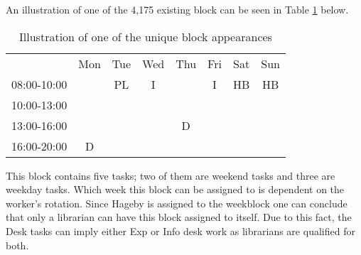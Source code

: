 An illustration of one of the 4,175 existing block can be seen in Table \ref{block_example} below.
\begin{table}[!h]
\centering
\caption{Illustration of one of the unique block appearances}
\label{block_example}
\begin{tabular}{cccccccc}
                           & Mon                                            & Tue                                             & Wed                    & Thu                                            & Fri                    & Sat                                             & Sun                                             \\ \cline{2-8} 
\multicolumn{1}{c|}{08:00-10:00}  & \multicolumn{1}{c|}{}                          & \multicolumn{1}{c|}{\cellcolor[HTML]{FCFF2F}PL} & \multicolumn{1}{c|}{I} & \multicolumn{1}{c|}{}                          & \multicolumn{1}{c|}{I} & \multicolumn{1}{c|}{\cellcolor[HTML]{FCFF2F}HB} & \multicolumn{1}{c|}{\cellcolor[HTML]{FCFF2F}HB} \\ \cline{2-8} 
\multicolumn{1}{c|}{10:00-13:00} & \multicolumn{1}{c|}{}                          & \multicolumn{1}{c|}{\cellcolor[HTML]{FCFF2F}}   & \multicolumn{1}{c|}{}  & \multicolumn{1}{c|}{}                          & \multicolumn{1}{c|}{}  &                                                 &                                                 \\ \cline{2-6}
\multicolumn{1}{c|}{13:00-16:00} & \multicolumn{1}{c|}{}                          & \multicolumn{1}{c|}{\cellcolor[HTML]{FCFF2F}}   & \multicolumn{1}{c|}{}  & \multicolumn{1}{c|}{\cellcolor[HTML]{FCFF2F}D} & \multicolumn{1}{c|}{}  &                                                 &                                                 \\ \cline{2-6}
\multicolumn{1}{c|}{16:00-20:00} & \multicolumn{1}{c|}{\cellcolor[HTML]{FCFF2F}D} & \multicolumn{1}{c|}{}                           & \multicolumn{1}{c|}{}  & \multicolumn{1}{c|}{}                          & \multicolumn{1}{c|}{}  &                                                 &                                                 \\ \cline{2-6}
\end{tabular}
\end{table}

This block contains five tasks; two of them are weekend tasks and three are weekday tasks. Which week this block can be assigned to is dependent on the worker's rotation. Since Hageby is assigned to the weekblock one can conclude that only a librarian can have this block assigned to itself. Due to this fact, the Desk tasks can imply either Exp or Info desk work as librarians are qualified for both.



